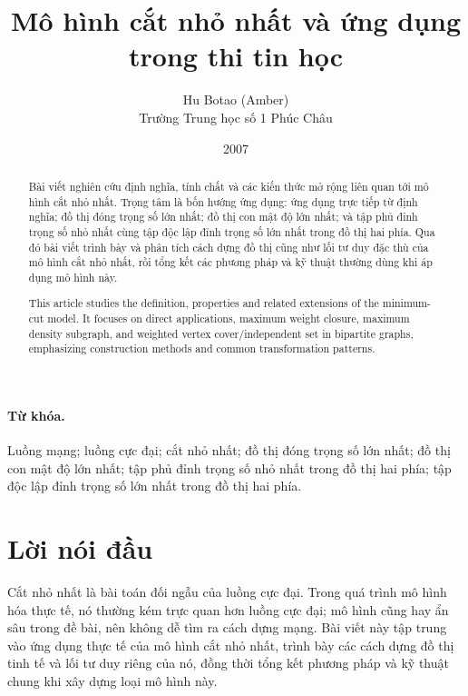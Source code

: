 \documentclass[11pt]{article}
\title{Mô hình cắt nhỏ nhất và ứng dụng trong thi tin học}
\author{Hu Botao (Amber)\\Trường Trung học số 1 Phúc Châu}
\date{2007}
\begin{document}
\maketitle


\begin{abstract}
Bài viết nghiên cứu định nghĩa, tính chất và các kiến thức mở rộng liên quan
tới mô hình cắt nhỏ nhất. Trọng tâm là bốn hướng ứng dụng: ứng dụng trực tiếp
từ định nghĩa; đồ thị đóng trọng số lớn nhất; đồ thị con mật độ lớn nhất; và
tập phủ đỉnh trọng số nhỏ nhất cùng tập độc lập đỉnh trọng số lớn nhất trong
đồ thị hai phía. Qua đó bài viết trình bày và phân tích cách dựng đồ thị cũng
như lối tư duy đặc thù của mô hình cắt nhỏ nhất, rồi tổng kết các phương pháp
và kỹ thuật thường dùng khi áp dụng mô hình này.
\end{abstract}

\paragraph{Từ khóa.}
Luồng mạng; luồng cực đại; cắt nhỏ nhất; đồ thị đóng trọng số lớn nhất; đồ
thị con mật độ lớn nhất; tập phủ đỉnh trọng số nhỏ nhất trong đồ thị hai phía;
tập độc lập đỉnh trọng số lớn nhất trong đồ thị hai phía.

\begin{abstract}
This article studies the definition, properties and related extensions of the
minimum-cut model. It focuses on direct applications, maximum weight closure,
maximum density subgraph, and weighted vertex cover/independent set in
bipartite graphs, emphasizing construction methods and common transformation
patterns.
\end{abstract}

\tableofcontents

\section{Lời nói đầu}

Cắt nhỏ nhất là bài toán đối ngẫu của luồng cực đại. Trong quá trình mô hình
hóa thực tế, nó thường kém trực quan hơn luồng cực đại; mô hình cũng hay ẩn
sâu trong đề bài, nên không dễ tìm ra cách dựng mạng. Bài viết này tập trung
vào ứng dụng thực tế của mô hình cắt nhỏ nhất, trình bày các cách dựng đồ thị
tinh tế và lối tư duy riêng của nó, đồng thời tổng kết phương pháp và kỹ thuật
chung khi xây dựng loại mô hình này.
\end{document}
